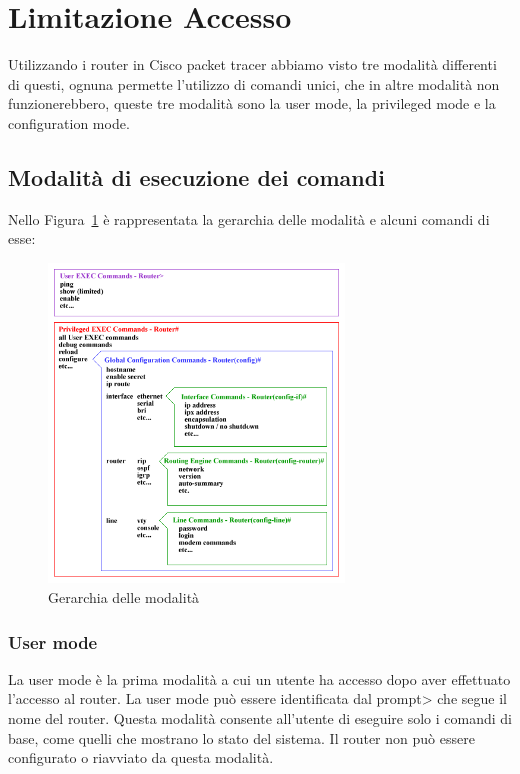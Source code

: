 \section{Limitazione Accesso}
Utilizzando i router in Cisco packet tracer abbiamo visto tre modalità differenti di questi, ognuna permette l’utilizzo di comandi unici, che in altre modalità non funzionerebbero, queste tre modalità sono la user mode, la privileged mode e la configuration mode.

\subsection{Modalità di esecuzione dei comandi}
Nello Figura~\ref{fig:exec-modes} è rappresentata la gerarchia delle modalità e alcuni comandi di esse:

\begin{figure}[htbp]
    \centering
    \includegraphics[width=0.7\textwidth]{images/03.limitazione.accesso/01.exec-modes.png}
    \caption{Gerarchia delle modalità}
    \label{fig:exec-modes}
\end{figure}

\subsubsection{User mode}
La user mode è la prima modalità a cui un utente ha accesso dopo aver effettuato l’accesso al router. La user mode può essere identificata dal prompt> che segue il nome del router. Questa modalità consente all’utente di eseguire solo i comandi di base, come quelli che mostrano lo stato del sistema. Il router non può essere configurato o riavviato da questa modalità.

